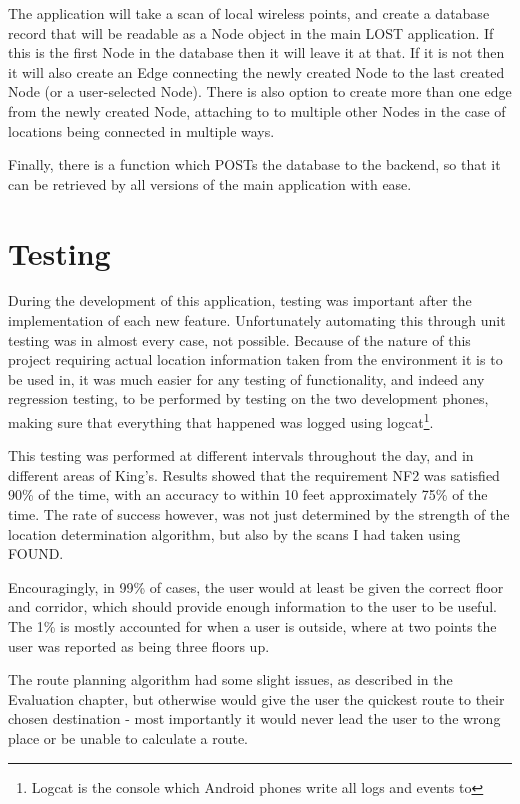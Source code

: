 \documentclass[11pt]{informatics-report}
\begin{document}
The application will take a scan of local wireless points, and create a database record that will be readable as a Node object in the main LOST application. If this is the first Node in the database then it will leave it at that. If it is not then it will also create an Edge connecting the newly created Node to the last created Node (or a user-selected Node). There is also option to create more than one edge from the newly created Node, attaching to to multiple other Nodes in the case of locations being connected in multiple ways.

Finally, there is a function which POSTs the database to the backend, so that it can be retrieved by all versions of the main application with ease.

\section{Testing}

During the development of this application, testing was important after the implementation of each new feature. Unfortunately automating this through unit testing was in almost every case, not possible. Because of the nature of this project requiring actual location information taken from the environment it is to be used in, it was much easier for any testing of functionality, and indeed any regression testing, to be performed by testing on the two development phones, making sure that everything that happened was logged using logcat\footnote{Logcat is the console which Android phones write all logs and events to}.

This testing was performed at different intervals throughout the day, and in different areas of King's. Results showed that the requirement NF2 was satisfied 90\% of the time, with an accuracy to within 10 feet approximately 75\% of the time. The rate of success however, was not just determined by the strength of the location determination algorithm, but also by the scans I had taken using FOUND. 

Encouragingly, in 99\% of cases, the user would at least be given the correct floor and corridor, which should provide enough information to the user to be useful. The 1\% is mostly accounted for when a user is outside, where at two points the user was reported as being three floors up.

The route planning algorithm had some slight issues, as described in the Evaluation chapter, but otherwise would give the user the quickest route to their chosen destination - most importantly it would never lead the user to the wrong place or be unable to calculate a route. 
\end{document}
